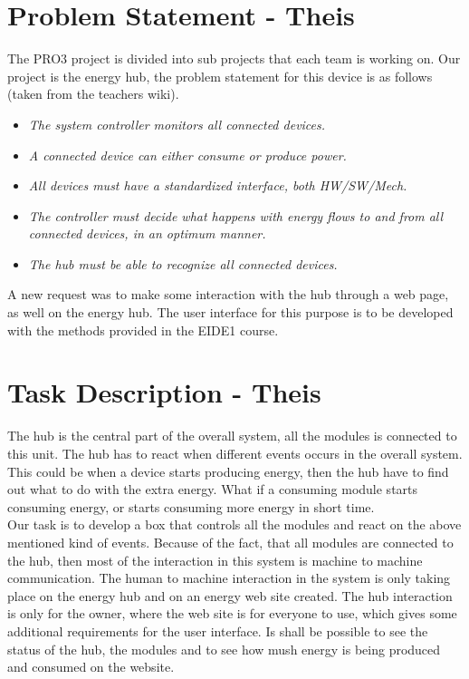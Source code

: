 \section{Problem Statement - Theis}
The PRO3 project is divided into sub projects that each team is working on. Our project is the energy hub, the problem statement for this device is as follows (taken from the teachers wiki).
\begin{itemize}
	\item\textit{The system controller monitors all connected devices.}
	\item\textit{A connected device can either consume or produce power.}
	\item\textit{All devices must have a standardized interface, both HW/SW/Mech.}
	\item\textit{The controller must decide what happens with energy flows to and from all connected devices, in an optimum manner.}
	\item\textit{The hub must be able to recognize all connected devices.}
\end{itemize}
A new request was to make some interaction with the hub through a web page, as well on the energy hub. The user interface for this purpose is to be developed with the methods provided in the EIDE1 course.


\section{Task Description - Theis}
The hub is the central part of the overall system, all the modules is connected to this unit. The hub has to react when different events occurs in the overall system. This could be when a device starts producing energy, then the hub have to find out what to do with the extra energy. What if a consuming module starts consuming energy, or starts consuming more energy in short time. 
\\[0.2cm]
Our task is to develop a box that controls all the modules and react on the above mentioned kind of events. Because of the fact, that all modules are connected to the hub, then most of the interaction in this system is machine to machine communication. The human to machine interaction in the system is only taking place on the energy hub and on an energy web site created. The hub interaction is only for the owner, where the web site is for everyone to use, which gives some additional requirements for the user interface. Is shall be possible to see the status of the hub, the modules and to see how mush energy is being produced and consumed on the website.

